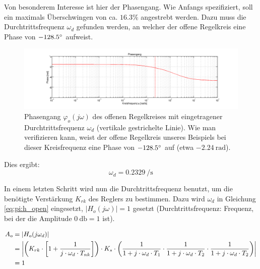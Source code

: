 Von besonderem  Interesse ist  hier der Phasengang. Wie  Anfangs spezifiziert,
soll  ein maximals  \"Uberschwingen von  ca. $16.3\%$ angestrebt  werden. Dazu
muss die Durchtrittsfrequenz $\omega_d$ gefunden werden, an welcher der offene
Regelkreis eine Phase von $-128.5\degree$ aufweist. \footnotemark[2]


\begin{figure}[h! width=\pagewidth]
    \includegraphics[width=.9\textwidth]{images/piOffenerRegelkreisPhasengang.png}
    \caption{%
        Phasengang   $\varphi_o(j\omega)$   des   offenen   Regelkreises   mit
        eingetragener Durchtrittsfrequenz $\omega_{d}$ (vertikale gestrichelte
        Linie). Wie man verifizieren kann, weist der offene Regelkreis unseres
        Beispiels bei dieser Kreisfrequenz  eine Phase von $-128.5\degree$ auf
        (etwa $\SI{-2.24}{\radian}$).
    }
    \label{fig:pi:omega_d}
\end{figure}

Dies ergibt:
\begin{equation} \label{eq:pi:omega_d}
    \omega_d = \SI{0.2329}{\per\second}
\end{equation}

In  einem  letzten  Schritt  wird  nun  die  Durchtrittsfrequenz  benutzt,  um
die  ben\"otigte Verst\"arkung  $K_{rk}$ des  Reglers zu  bestimmen. Dazu wird
$\omega_d$ in  Gleichung \ref{eq:pi:h_open}  eingesetzt, $|H_o(j\omega)|  = 1$
gesetzt    (Durchtrittsfrequenz: Frequenz,     bei    der     die    Amplitude
$\SI{0}{\decibel} = 1$ ist).

\begin{gather} \label{eq:pi:A_o_set_to_one}
    \begin{split}
        A_o & = | H_o (j\omega_d) | \\
            & = \abs*{
                    \bigg(
                        K_{rk} \cdot \biggl[ 1 + \frac{1}{j \cdot \omega_d \cdot T_{nk}} \biggr]
                    \bigg)
                    \cdot
                    K_s
                    \cdot
                    \bigg(
                            \frac{1}{1 + j \cdot \omega_d \cdot T_1}
                      \cdot \frac{1}{1 + j \cdot \omega_d \cdot T_2}
                      \cdot \frac{1}{1 + j \cdot \omega_d \cdot T_2}
                      \bigg)} \\
              & = 1
    \end{split}
\end{gather}


